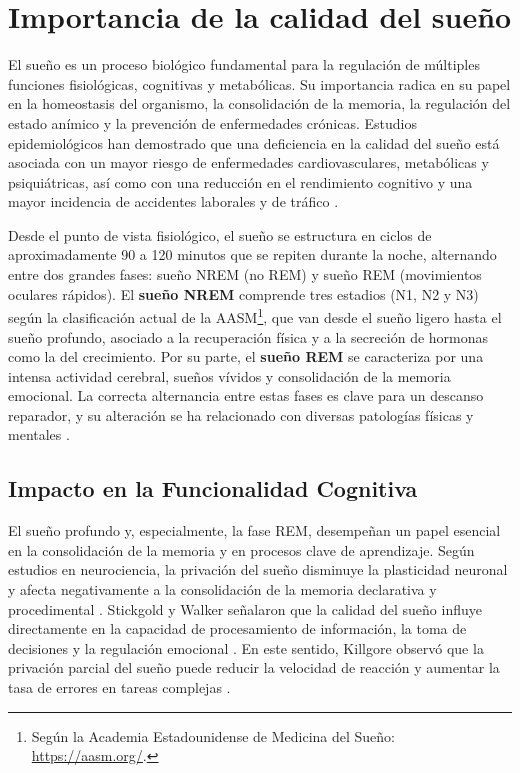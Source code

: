 

\section{ Importancia de la calidad del sueño}

El sueño es un proceso biológico fundamental para la regulación de múltiples funciones fisiológicas, cognitivas y metabólicas. Su importancia radica en su papel en la homeostasis del organismo, la consolidación de la memoria, la regulación del estado anímico y la prevención de enfermedades crónicas. Estudios epidemiológicos han demostrado que una deficiencia en la calidad del sueño está asociada con un mayor riesgo de enfermedades cardiovasculares, metabólicas y psiquiátricas, así como con una reducción en el rendimiento cognitivo y una mayor incidencia de accidentes laborales y de tráfico  \cite{interactions}.

Desde el punto de vista fisiológico, el sueño se estructura en ciclos de aproximadamente 90 a 120 minutos que se repiten durante la noche, alternando entre dos grandes fases: sueño NREM (no REM) y sueño REM (movimientos oculares rápidos). El \textbf{sueño NREM} comprende tres estadios (N1, N2 y N3) según la clasificación actual de la AASM\footnote{Según la Academia Estadounidense de Medicina del Sueño: \url{https://aasm.org/}.}, que van desde el sueño ligero hasta el sueño profundo, asociado a la recuperación física y a la secreción de hormonas como la del crecimiento. Por su parte, el \textbf{sueño REM} se caracteriza por una intensa actividad cerebral, sueños vívidos y consolidación de la memoria emocional. La correcta alternancia entre estas fases es clave para un descanso reparador, y su alteración se ha relacionado con diversas patologías físicas y mentales \cite{sleepfoundation2023}.


\subsection{Impacto en la Funcionalidad Cognitiva}


El sueño profundo y, especialmente, la fase REM, desempeñan un papel esencial en la consolidación de la memoria y en procesos clave de aprendizaje. Según estudios en neurociencia, la privación del sueño disminuye la plasticidad neuronal y afecta negativamente a la consolidación de la memoria declarativa y procedimental \cite{funcionCognitiva}. Stickgold y Walker señalaron que la calidad del sueño influye directamente en la capacidad de procesamiento de información, la toma de decisiones y la regulación emocional \cite{calidadSueño}. En este sentido, Killgore observó que la privación parcial del sueño puede reducir la velocidad de reacción y aumentar la tasa de errores en tareas complejas \cite{efectosSueño}.


